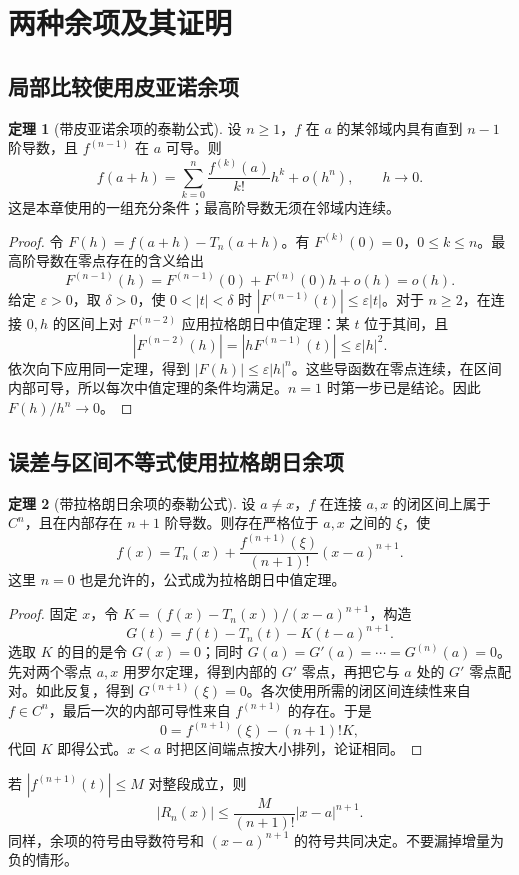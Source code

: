 \documentclass[UTF8,fontset=fandol,12pt,oneside,openany]{ctexrep}
\theoremstyle{definition}
\newtheorem{theorem}{定理}[chapter]
\begin{document}
\section{两种余项及其证明}
\subsection{局部比较使用皮亚诺余项}
\begin{theorem}[带皮亚诺余项的泰勒公式]
设 $n\ge1$，$f$ 在 $a$ 的某邻域内具有直到 $n-1$ 阶导数，且 $f^{(n-1)}$ 在 $a$ 可导。则
\[
f(a+h)=\sum_{k=0}^n\frac{f^{(k)}(a)}{k!}h^k+o(h^n),\qquad h\to0.
\]
这是本章使用的一组充分条件；最高阶导数无须在邻域内连续。
\end{theorem}
\begin{proof}
令 $F(h)=f(a+h)-T_n(a+h)$。有 $F^{(k)}(0)=0$，$0\le k\le n$。最高阶导数在零点存在的含义给出
\[
F^{(n-1)}(h)=F^{(n-1)}(0)+F^{(n)}(0)h+o(h)=o(h).
\]
给定 $\varepsilon>0$，取 $\delta>0$，使 $0<|t|<\delta$ 时 $|F^{(n-1)}(t)|\le\varepsilon|t|$。对于 $n\ge2$，在连接 $0,h$ 的区间上对 $F^{(n-2)}$ 应用拉格朗日中值定理：某 $t$ 位于其间，且
\[
|F^{(n-2)}(h)|=|hF^{(n-1)}(t)|\le\varepsilon |h|^2.
\]
依次向下应用同一定理，得到 $|F(h)|\le\varepsilon |h|^n$。这些导函数在零点连续，在区间内部可导，所以每次中值定理的条件均满足。$n=1$ 时第一步已是结论。因此 $F(h)/h^n\to0$。
\end{proof}
\subsection{误差与区间不等式使用拉格朗日余项}
\begin{theorem}[带拉格朗日余项的泰勒公式]
设 $a\ne x$，$f$ 在连接 $a,x$ 的闭区间上属于 $C^n$，且在内部存在 $n+1$ 阶导数。则存在严格位于 $a,x$ 之间的 $\xi$，使
\[
f(x)=T_n(x)+\frac{f^{(n+1)}(\xi)}{(n+1)!}(x-a)^{n+1}.
\]
这里 $n=0$ 也是允许的，公式成为拉格朗日中值定理。
\end{theorem}
\begin{proof}
固定 $x$，令 $K=(f(x)-T_n(x))/(x-a)^{n+1}$，构造
\[
G(t)=f(t)-T_n(t)-K(t-a)^{n+1}.
\]
选取 $K$ 的目的是令 $G(x)=0$；同时 $G(a)=G'(a)=\cdots=G^{(n)}(a)=0$。先对两个零点 $a,x$ 用罗尔定理，得到内部的 $G'$ 零点，再把它与 $a$ 处的 $G'$ 零点配对。如此反复，得到 $G^{(n+1)}(\xi)=0$。各次使用所需的闭区间连续性来自 $f\in C^n$，最后一次的内部可导性来自 $f^{(n+1)}$ 的存在。于是
\[
0=f^{(n+1)}(\xi)-(n+1)!K,
\]
代回 $K$ 即得公式。$x<a$ 时把区间端点按大小排列，论证相同。
\end{proof}
若 $|f^{(n+1)}(t)|\le M$ 对整段成立，则
\[
|R_n(x)|\le\frac{M}{(n+1)!}|x-a|^{n+1}.
\]
同样，余项的符号由导数符号和 $(x-a)^{n+1}$ 的符号共同决定。不要漏掉增量为负的情形。
\end{document}
